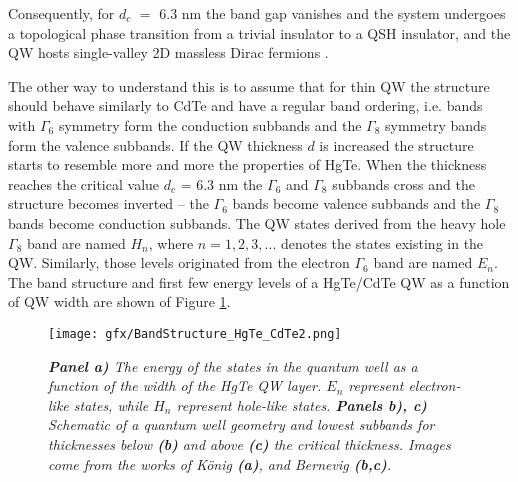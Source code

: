 \documentclass[titlepage,a4paper]{book}
\begin{document}
Consequently, for $d_c$ $=$ 6.3 nm the band gap vanishes and the system undergoes a topological phase transition from a trivial insulator to a QSH insulator, and the QW hosts single-valley 2D massless Dirac fermions \cite{Buttner_MCT_SQW}. 

The other way to understand this is to assume that for thin QW the structure should behave similarly to CdTe and have a regular band ordering, i.e. bands with $\Gamma_6$ symmetry form the conduction subbands and the $\Gamma_8$ symmetry bands form the valence subbands. If the QW thickness $d$ is increased the structure starts to resemble more and more the properties of HgTe. When the thickness reaches the critical value $d_c$ = 6.3 nm the $\Gamma_6$ and $\Gamma_8$ subbands cross and the structure becomes inverted -- the $\Gamma_6$ bands become valence subbands and the $\Gamma_8$ bands become conduction subbands. The QW states derived from the heavy hole $\Gamma_8$ band are named $H_n$, where $n = 1, 2, 3, ...$ denotes the states existing in the QW. Similarly, those levels originated from the electron $\Gamma_6$ band are named $E_n$. The band structure and first few energy levels of a HgTe/CdTe QW as a function of QW width are shown of Figure \ref{fig:BandStructure_HgTe_CdTe2}.  

\begin{figure}[ht]
	\centering
	\texttt{[image: gfx/BandStructure\_HgTe\_CdTe2.png]}
	\vspace{-10pt}
	\caption{\textit{\textbf{Panel a)} The energy of the states in the quantum well as a function of the width of the HgTe QW layer. $E_n$ represent electron-like states, while $H_n$ represent hole-like states. \textbf{Panels b), c)} Schematic of a quantum well geometry and lowest subbands for thicknesses below \textbf{(b)} and above \textbf{(c)} the critical thickness. Images come from the works of König \cite{Konig_MCT_SQW} \textbf{(a)}, and Bernevig \cite{Bernevig_Topology2} \textbf{(b,c)}.}}
	\label{fig:BandStructure_HgTe_CdTe2}
\end{figure} 
\end{document}
